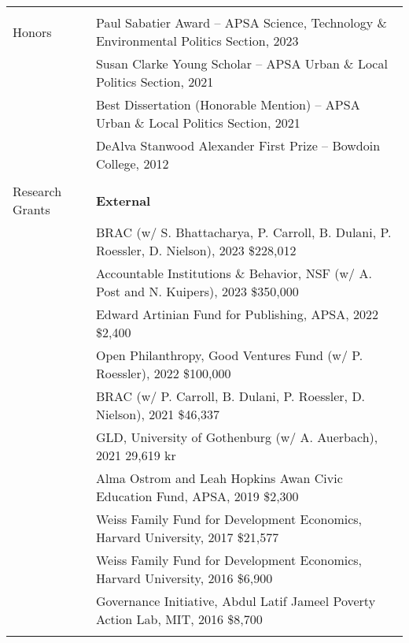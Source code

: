 \documentclass[letterpaper, 10.5pt]{article}
\begin{document}
\begin{longtable}{p{1.5in}p{5in}}
&\\




{{Honors}} 
& Paul Sabatier Award -- APSA Science, Technology \& Environmental Politics Section, 2023\\
& Susan Clarke Young Scholar -- APSA Urban \& Local Politics Section, 2021\\

& Best Dissertation  (Honorable Mention) -- APSA Urban \& Local Politics Section, 2021 \\
& DeAlva Stanwood Alexander First Prize -- Bowdoin College, 2012 \\

& \\

{{Research Grants}} 
& \textbf{External}\\
& BRAC (w/ S. Bhattacharya, P. Carroll, B. Dulani, P. Roessler,  D. Nielson), 2023
 \hfill \$228,012\\
& Accountable Institutions \& Behavior, NSF (w/ A. Post and N. Kuipers), 2023 \hfill \$350,000\\
& Edward Artinian Fund for Publishing, APSA, 2022 \hfill \$2,400\\
& Open Philanthropy, Good Ventures Fund (w/ P. Roessler), 2022 \hfill \$100,000\\
& BRAC (w/ P. Carroll, B. Dulani, P. Roessler,  D. Nielson), 2021
 \hfill \$46,337\\


& GLD, University of Gothenburg (w/ A. Auerbach), 2021
\hfill 29,619 kr \\


& Alma Ostrom and Leah Hopkins Awan Civic Education Fund, APSA, 2019 \hfill \$2,300\\



& Weiss Family Fund for Development Economics, Harvard University, 2017
 \hfill \$21,577\\


&Weiss Family Fund for Development Economics, Harvard University, 2016 \hfill \$6,900  \\

&Governance Initiative, Abdul Latif Jameel Poverty Action Lab, MIT, 2016 \hfill \$8,700 \\

& \\


\end{longtable}
\end{document}
